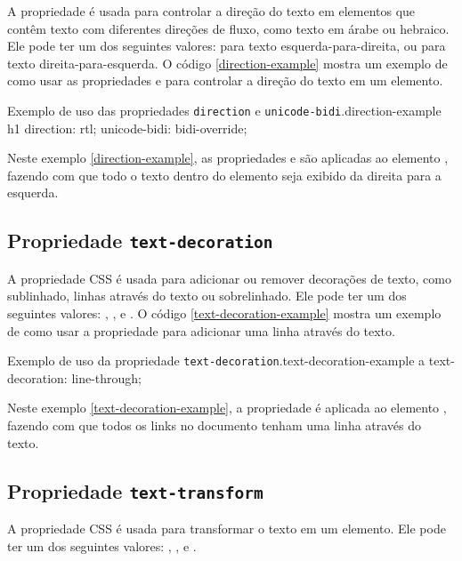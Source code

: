 A propriedade  é usada para controlar a direção do texto em elementos que contêm texto com diferentes direções de fluxo, como texto em árabe ou hebraico. Ele pode ter um dos seguintes valores:  para texto esquerda-para-direita, ou  para texto direita-para-esquerda. O código \ref{direction-example} mostra um exemplo de como usar as propriedades  e  para controlar a direção do texto em um elemento.

\begin{csscode}{Exemplo de uso das propriedades \texttt{direction} e \texttt{unicode-bidi}.}{direction-example}
h1 {
    direction: rtl;
    unicode-bidi: bidi-override;
}
\end{csscode}

Neste exemplo \ref{direction-example}, as propriedades  e  são aplicadas ao elemento , fazendo com que todo o texto dentro do elemento seja exibido da direita para a esquerda.

\subsection{Propriedade \texttt{text-decoration}}

A propriedade CSS  é usada para adicionar ou remover decorações de texto, como sublinhado, linhas através do texto ou sobrelinhado. Ele pode ter um dos seguintes valores: , ,  e . O código \ref{text-decoration-example} mostra um exemplo de como usar a propriedade  para adicionar uma linha através do texto.

\begin{csscode}{Exemplo de uso da propriedade \texttt{text-decoration}.}{text-decoration-example}
a {
    text-decoration: line-through;
}
\end{csscode}

Neste exemplo \ref{text-decoration-example}, a propriedade  é aplicada ao elemento , fazendo com que todos os links no documento tenham uma linha através do texto.

\subsection{Propriedade \texttt{text-transform}}

A propriedade CSS  é usada para transformar o texto em um elemento. Ele pode ter um dos seguintes valores: , ,  e .

